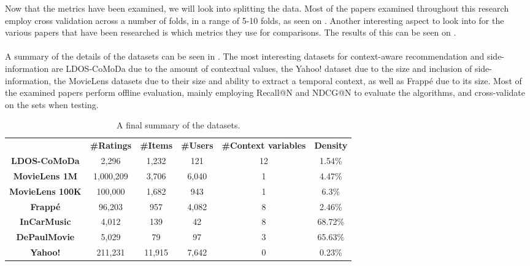 Now that the metrics have been examined, we will look into splitting the data.
Most of the papers examined throughout this research employ cross validation across a number of folds, in a range of 5-10 folds, as seen on .
Another interesting aspect to look into for the various papers that have been researched is which metrics they use for comparisons.
The results of this can be seen on .
\\\\
A summary of the details of the datasets can be seen in .
The most interesting datasets for context-aware recommendation and side-information are LDOS-CoMoDa due to the amount of contextual values, the Yahoo! dataset due to the size and inclusion of side-information, the MovieLens datasets due to their size and ability to extract a temporal context, as well as Frappé due to its size.
Most of the examined papers perform offline evaluation, mainly employing Recall@N and NDCG@N to evaluate the algorithms, and cross-validate on the sets when testing.
\begin{table*}[]\centering
    \caption{A final summary of the datasets.}\label{tab:datasetstats}
    \scriptsize
    \begin{tabular}{cccccc}\toprule
        &\textbf{\#Ratings} & \textbf{\#Items} & \textbf{\#Users} & \textbf{\#Context variables} & \textbf{Density}\\\cmidrule{1-6}
        \textbf{LDOS-CoMoDa} & 2,296 & 1,232 & 121 & 12 & 1.54\% \\\cmidrule{1-6}
        \textbf{MovieLens 1M} & 1,000,209 & 3,706 & 6,040 & 1 & 4.47\% \\\cmidrule{1-6}
        \textbf{MovieLens 100K} & 100,000 & 1,682 & 943 & 1 & 6.3\% \\\cmidrule{1-6}
        \textbf{Frappé} & 96,203 & 957 & 4,082 & 8 & 2.46\% \\\cmidrule{1-6}
        \textbf{InCarMusic} & 4,012 & 139 & 42 & 8 & 68.72\% \\\cmidrule{1-6}
        \textbf{DePaulMovie} & 5,029 & 79 & 97 & 3 & 65.63\% \\\cmidrule{1-6}
        \textbf{Yahoo!} & 211,231 & 11,915 & 7,642 & 0 & 0.23\% \\\cmidrule{1-6}
    \bottomrule
    \end{tabular}
\end{table*}
